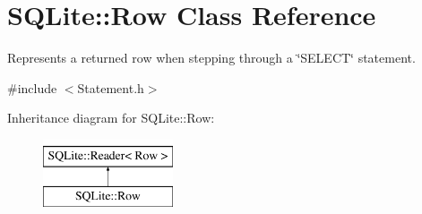 \hypertarget{a00011}{\section{S\-Q\-Lite\-:\-:Row Class Reference}
\label{a00011}
}


Represents a returned row when stepping through a \char`\"{}\-S\-E\-L\-E\-C\-T\char`\"{} statement.  




{\ttfamily \#include $<$Statement.\-h$>$}

Inheritance diagram for S\-Q\-Lite\-:\-:Row\-:\begin{figure}[H]
\begin{center}
\leavevmode
\includegraphics[height=2.000000cm]{a00011}
\end{center}
\end{figure}
